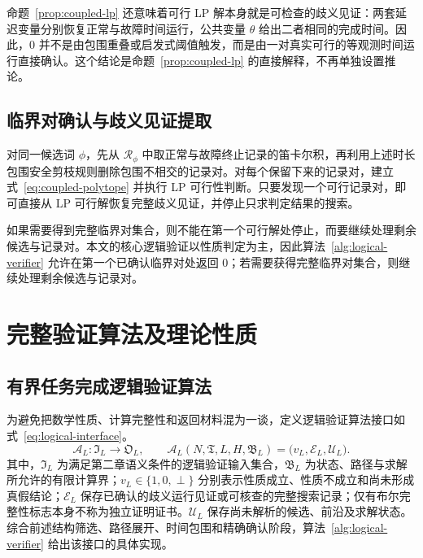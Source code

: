 \documentclass[master,fontset=ubuntu]{shnuthesis}
\DeclareRobustCommand{\logicstatus}[1]{\ensuremath{#1}}
\theoremstyle{definition}
\begin{document}
命题~\ref{prop:coupled-lp} 还意味着可行 LP 解本身就是可检查的歧义见证：两套延迟变量分别恢复正常与故障时间运行，公共变量 \(\theta\) 给出二者相同的完成时间。因此，\logicstatus{0} 并不是由包围重叠或启发式阈值触发，而是由一对真实可行的等观测时间运行直接确认。这个结论是命题~\ref{prop:coupled-lp} 的直接解释，不再单独设置推论。

\subsection{临界对确认与歧义见证提取}

对同一候选词 \(\phi\)，先从 \(\mathcal R_\phi\) 中取正常与故障终止记录的笛卡尔积，再利用上述时长包围安全剪枝规则删除包围不相交的记录对。对每个保留下来的记录对，建立式~\eqref{eq:coupled-polytope} 并执行 LP 可行性判断。只要发现一个可行记录对，即可直接从 LP 可行解恢复完整歧义见证，并停止只求判定结果的搜索。

如果需要得到完整临界对集合，则不能在第一个可行解处停止，而要继续处理剩余候选与记录对。本文的核心逻辑验证以性质判定为主，因此算法~\ref{alg:logical-verifier} 允许在第一个已确认临界对处返回 \logicstatus{0}；若需要获得完整临界对集合，则继续处理剩余候选与记录对。

\section{完整验证算法及理论性质}

\subsection{有界任务完成逻辑验证算法}

为避免把数学性质、计算完整性和返回材料混为一谈，定义逻辑验证算法接口如式~\eqref{eq:logical-interface}。
\begin{equation}
\mathcal A_L:\mathfrak I_L\rightarrow\mathfrak O_L,
\qquad
\mathcal A_L(N,\mathfrak T,L,H,\mathfrak B_L)
=\bigl(v_L,\mathcal E_L,\mathcal U_L\bigr).
\label{eq:logical-interface}
\end{equation}
其中，\(\mathfrak I_L\) 为满足第二章语义条件的逻辑验证输入集合，\(\mathfrak B_L\) 为状态、路径与求解所允许的有限计算界；\(v_L\in\{1,0,\perp\}\) 分别表示性质成立、性质不成立和尚未形成真假结论；\(\mathcal E_L\) 保存已确认的歧义运行见证或可核查的完整搜索记录；仅有布尔完整性标志本身不称为独立证明证书。\(\mathcal U_L\) 保存尚未解析的候选、前沿及求解状态。综合前述结构筛选、路径展开、时间包围和精确确认阶段，算法~\ref{alg:logical-verifier} 给出该接口的具体实现。
\end{document}
